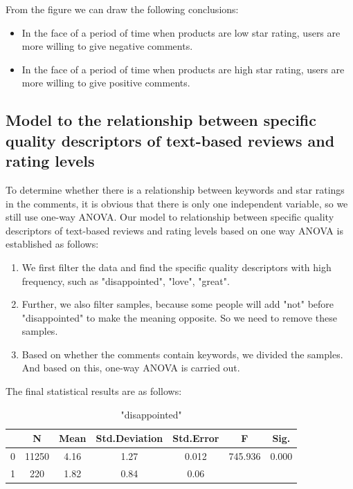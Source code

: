 \documentclass{mcmthesis}
\begin{document}
From the figure we can draw the following conclusions:
\begin{itemize}
	\item In the face of a period of time when products are low star rating, users are more willing to give negative comments.
	\item In the face of a period of time when products are high star rating, users are more willing to give positive comments.
\end{itemize}

\subsection{Model to the relationship between specific quality descriptors of text-based reviews and rating levels}
To determine whether there is a relationship between keywords and star ratings in the comments, it is obvious that there is only one independent variable, so we still use one-way ANOVA. Our model to relationship between specific quality descriptors of text-based reviews and rating levels based on one way ANOVA is established as follows:\\
\begin{enumerate}
	\item We first filter the data and find the specific quality descriptors with high frequency, such as "disappointed", "love", "great".
	\item Further, we also filter samples, because some people will add "not" before "disappointed" to make the meaning opposite. So we need to remove these samples.
	\item Based on whether the comments contain keywords, we divided the samples. And based on this, one-way ANOVA is carried out.
\end{enumerate}
The final statistical results are as follows:\\
\begin{table}[H]
	\center
	\caption{"disappointed"}
	\label{type}
	\begin{tabular}{c|c|c|c|c|c|c}
		\hline
		\textbf{} & \textbf{N} & \textbf{Mean}& \textbf{Std.Deviation}& \textbf{Std.Error}& \textbf{F}& \textbf{Sig.} \\ \hline 
		0        & 11250             & 4.16           & 1.27         & 0.012    & 745.936 & 0.000    \\
		1          & 220          & 1.82           & 0.84         & 0.06    &  & \\ \hline

	\end{tabular}
\end{table}
\end{document}
